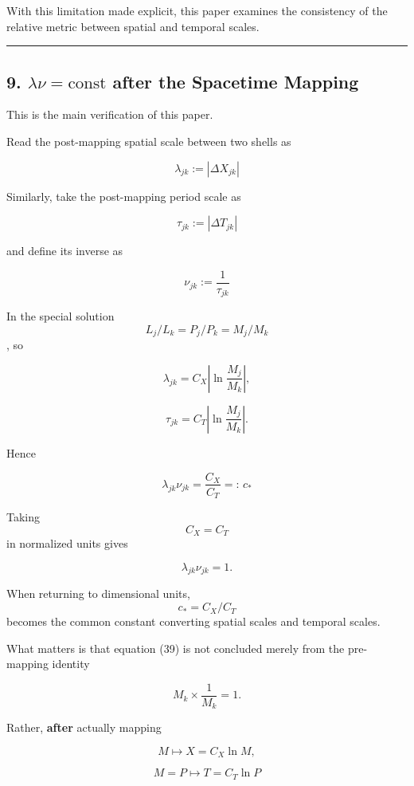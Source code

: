 \documentclass[
  a4paper,
]{article}
\begin{document}
With this limitation made explicit, this paper examines the consistency
of the relative metric between spatial and temporal scales.

\begin{center}\rule{0.5\linewidth}{0.5pt}\end{center}

\subsection{\texorpdfstring{9. \(\lambda\nu=\mathrm{const}\) after the
Spacetime
Mapping}{9. \textbackslash lambda\textbackslash nu=\textbackslash mathrm\{const\} after the Spacetime Mapping}}\label{lambdanumathrmconst-after-the-spacetime-mapping}

This is the main verification of this paper.

Read the post-mapping spatial scale between two shells as

\[
\boxed{
\lambda_{jk}
:=
|\Delta X_{jk}|
}
\tag{35}
\]

Similarly, take the post-mapping period scale as

\[
\boxed{
\tau_{jk}
:=
|\Delta T_{jk}|
}
\tag{36}
\]

and define its inverse as

\[
\boxed{
\nu_{jk}
:=
\frac{1}{\tau_{jk}}
}
\tag{37}
\]

In the special solution \[L_j/L_k=P_j/P_k=M_j/M_k\], so

\[
\lambda_{jk}
=
C_X\left|\ln\frac{M_j}{M_k}\right|,
\]

\[
\tau_{jk}
=
C_T\left|\ln\frac{M_j}{M_k}\right|.
\]

Hence

\[
\boxed{
\lambda_{jk}\nu_{jk}
=
\frac{C_X}{C_T}
=:\,c_*
}
\tag{38}
\]

Taking \[C_X=C_T\] in normalized units gives

\[
\boxed{
\lambda_{jk}\nu_{jk}=1.
}
\tag{39}
\]

When returning to dimensional units, \[c_*=C_X/C_T\] becomes the common
constant converting spatial scales and temporal scales.

What matters is that equation (39) is not concluded merely from the
pre-mapping identity

\[
M_k\times\frac{1}{M_k}=1.
\]

Rather, \textbf{after} actually mapping

\[
M
\longmapsto
X=C_X\ln M,
\]

\[
M=P
\longmapsto
T=C_T\ln P
\]
\end{document}
